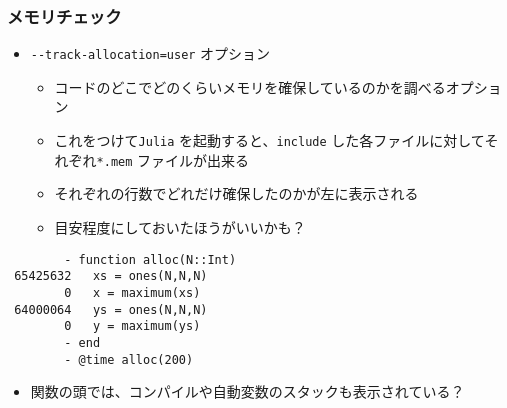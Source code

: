  \begin{frame}[containsverbatim]
 \frametitle{メモリチェック}
 \begin{itemize}
   \item \verb|--track-allocation=user| オプション
     \begin{itemize}
       \item コードのどこでどのくらいメモリを確保しているのかを調べるオプション
       \item これをつけて\verb|Julia| を起動すると、\verb|include| した各ファイルに対してそれぞれ\verb|*.mem| ファイルが出来る
       \item それぞれの行数でどれだけ確保したのかが左に表示される
       \item 目安程度にしておいたほうがいいかも？
     \end{itemize}
 \end{itemize}
 \begin{lstlisting}
        - function alloc(N::Int)
 65425632   xs = ones(N,N,N)
        0   x = maximum(xs)
 64000064   ys = ones(N,N,N)
        0   y = maximum(ys)
        - end
        - @time alloc(200)
 \end{lstlisting}
 \begin{itemize}
   \item 関数の頭では、コンパイルや自動変数のスタックも表示されている？
 \end{itemize}
 \end{frame}

